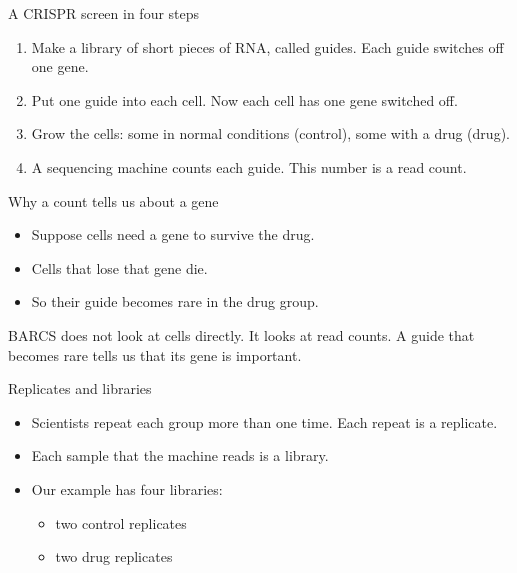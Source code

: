 \documentclass[aspectratio=169,11pt]{beamer}
\begin{document}
\begin{frame}{A CRISPR screen in four steps}
\begin{enumerate}
\item Make a \alert{library} of short pieces of RNA, called \alert{guides}.
  Each guide switches off one gene.
\item Put one guide into each cell. Now each cell has one gene switched off.
\item Grow the cells: some in normal conditions (\alert{control}), some
  with a drug (\alert{drug}).
\item A sequencing machine counts each guide. This number is a
  \alert{read count}.
\end{enumerate}
\medskip
\begin{center}
\end{center}
\end{frame}

\begin{frame}{Why a count tells us about a gene}
\begin{itemize}
\item Suppose cells need a gene to survive the drug.
\item Cells that lose that gene die.
\item So their guide becomes \alert{rare} in the drug group.
\end{itemize}
\bigskip
\begin{remember}
BARCS does not look at cells directly. It looks at read counts. A guide
that becomes rare tells us that its gene is important.
\end{remember}
\end{frame}

\begin{frame}{Replicates and libraries}
\begin{itemize}
\item Scientists repeat each group more than one time.
  Each repeat is a \alert{replicate}.
\item Each sample that the machine reads is a \alert{library}.
\item Our example has \alert{four libraries}:
  \begin{itemize}
  \item two control replicates
  \item two drug replicates
  \end{itemize}
\end{itemize}
\end{frame}
\end{document}
